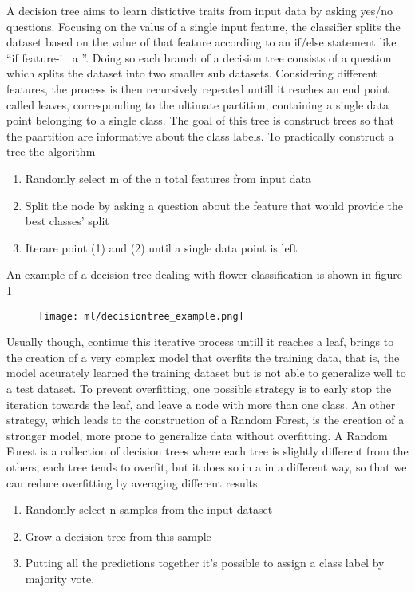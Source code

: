 \documentclass[a4paper,11pt]{article}
\begin{document}
A decision tree aims to learn distictive traits from input data by asking yes/no questions. Focusing on the valus of a single input feature, the classifier splits the dataset based on the value of that feature according to an if/else statement like \textquotedblleft if feature-i $\>$ a \textquotedblright.
Doing so each branch of a decision tree consists of a question which splits the dataset into two smaller sub datasets.
Considering different features, the process is then recursively repeated untill it reaches an end point called leaves, corresponding to the ultimate partition, containing a single data point belonging to a single class.
The goal of this tree is construct trees so that the paartition are informative about the class labels.
To practically construct a tree the algorithm
\begin{enumerate}
\item Randomly select m of the n total features from input data
\item Split the node by asking a question about the feature that would provide the best classes' split
\item Iterare point (1) and (2) until a single data point is left
\end{enumerate}

An example of a decision tree dealing with flower classification is shown in figure \ref{fig:decisiontree}
\begin{figure}
\centering
\texttt{[image: ml/decisiontree\_example.png]}
\caption{}
\label{fig:decisiontree}
\end{figure}


Usually though, continue this iterative process untill it reaches a leaf, brings to the creation of a very complex model that overfits the training data, that is, the model accurately learned the training dataset but is not able to generalize well to a test dataset.
To prevent overfitting, one possible strategy is to early stop the iteration towards the leaf, and leave a node with more than one class.
An other strategy, which leads to the construction of a Random Forest, is the creation of a stronger model, more prone to generalize data without overfitting.
A Random Forest is a collection of decision trees where each tree is slightly different from the others, each tree tends to overfit, but it does so in a in a different way, so that we can reduce overfitting by averaging different results.

\begin{enumerate}
\item Randomly select n samples from the input dataset
\item Grow a decision tree from this sample
\item Putting all the predictions together it's possible to assign a class label by majority vote.
\end{enumerate}
\end{document}
